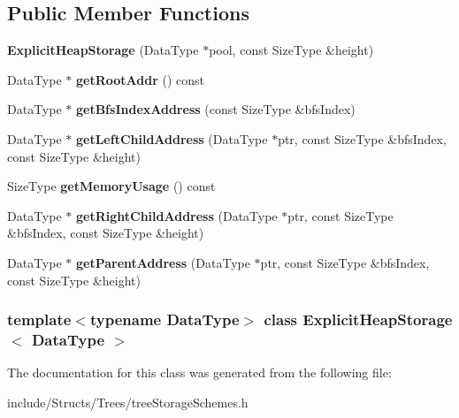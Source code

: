 \subsection*{Public Member Functions}
\begin{DoxyCompactItemize}
\item 
\hypertarget{class_explicit_heap_storage_a60a6a619f43dae73bcc37a9326466834}{
{\bfseries ExplicitHeapStorage} (DataType $\ast$pool, const SizeType \&height)}
\label{class_explicit_heap_storage_a60a6a619f43dae73bcc37a9326466834}

\item 
\hypertarget{class_explicit_heap_storage_a008de448af41bdc3efe1997694d0ff58}{
DataType $\ast$ {\bfseries getRootAddr} () const }
\label{class_explicit_heap_storage_a008de448af41bdc3efe1997694d0ff58}

\item 
\hypertarget{class_explicit_heap_storage_a3770c0e081c24f8df01a74dbb5a67c40}{
DataType $\ast$ {\bfseries getBfsIndexAddress} (const SizeType \&bfsIndex)}
\label{class_explicit_heap_storage_a3770c0e081c24f8df01a74dbb5a67c40}

\item 
\hypertarget{class_explicit_heap_storage_a0a6d2ce4388f02299a0aea9b53bbb153}{
DataType $\ast$ {\bfseries getLeftChildAddress} (DataType $\ast$ptr, const SizeType \&bfsIndex, const SizeType \&height)}
\label{class_explicit_heap_storage_a0a6d2ce4388f02299a0aea9b53bbb153}

\item 
\hypertarget{class_explicit_heap_storage_ac46f219ba9f2ffb8375c093d7f4b9260}{
SizeType {\bfseries getMemoryUsage} () const }
\label{class_explicit_heap_storage_ac46f219ba9f2ffb8375c093d7f4b9260}

\item 
\hypertarget{class_explicit_heap_storage_a886d855103b77eff99589f84ef8f9e06}{
DataType $\ast$ {\bfseries getRightChildAddress} (DataType $\ast$ptr, const SizeType \&bfsIndex, const SizeType \&height)}
\label{class_explicit_heap_storage_a886d855103b77eff99589f84ef8f9e06}

\item 
\hypertarget{class_explicit_heap_storage_a84ec7aeca0de117ca003fa58115dfb7e}{
DataType $\ast$ {\bfseries getParentAddress} (DataType $\ast$ptr, const SizeType \&bfsIndex, const SizeType \&height)}
\label{class_explicit_heap_storage_a84ec7aeca0de117ca003fa58115dfb7e}

\end{DoxyCompactItemize}
\subsubsection*{template$<$typename DataType$>$ class ExplicitHeapStorage$<$ DataType $>$}



The documentation for this class was generated from the following file:\begin{DoxyCompactItemize}
\item 
include/Structs/Trees/treeStorageSchemes.h\end{DoxyCompactItemize}
